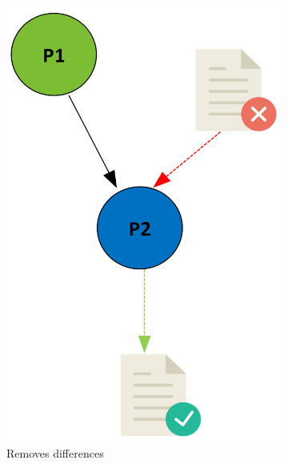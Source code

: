 \documentclass[a4paper,num-refs]{oup-contemporary}
\begin{document}
\begin{figure}
\begin{subfigure}{0.4\linewidth}
    \includegraphics[scale=0.34]{images/blue.png}
    \caption{Removes differences}
    \label{fig:blue}
    \end{subfigure}
    \hfill
    \begin{subfigure}{0.4\linewidth}

\end{subfigure}
\end{figure}
\end{document}
